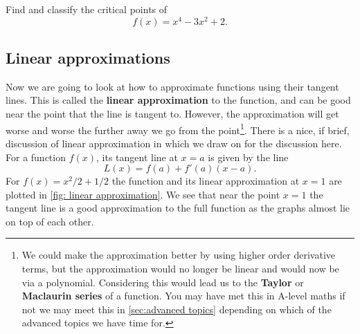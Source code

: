 \begin{exercise}
Find and classify the critical points of 
\begin{equation*}
f(x)=x^{4}-3x^{2}+2.
\end{equation*}
\end{exercise}



\subsection*{Linear approximations}
Now we are going to look at how to approximate functions using their tangent lines. This is called the \textbf{linear approximation} to the function, and can be good near the point that the line is tangent to. However, the approximation will get worse and worse the further away we go from the point\footnote{We could make the approximation better by using higher order derivative terms, but the approximation would no longer be linear and would now be via a polynomial. Considering this would lead us to the \textbf{Taylor} or \textbf{Maclaurin series} of a function. You may have met this in A-level maths if not we may meet this in \cref{sec:advanced topics} depending on which of the advanced topics we have time for. }.  There is a nice, if brief, discussion of linear approximation in \citep{calcI} which we draw on for the discussion here.\\

For a function $f(x)$, its tangent line at $x=a$ is given by the line
\begin{equation}
L(x)=f(a)+f'(a)\left(x-a\right).
\label{eq: linear approximation}
\end{equation}
For $f(x)=x^{2}/2+1/2$ the function and its linear approximation at $x=1$ are plotted in \cref{fig: linear approximation}. We see that near the point $x=1$ the tangent line is a good approximation to the full function as the graphs almost lie on top of each other. \\


